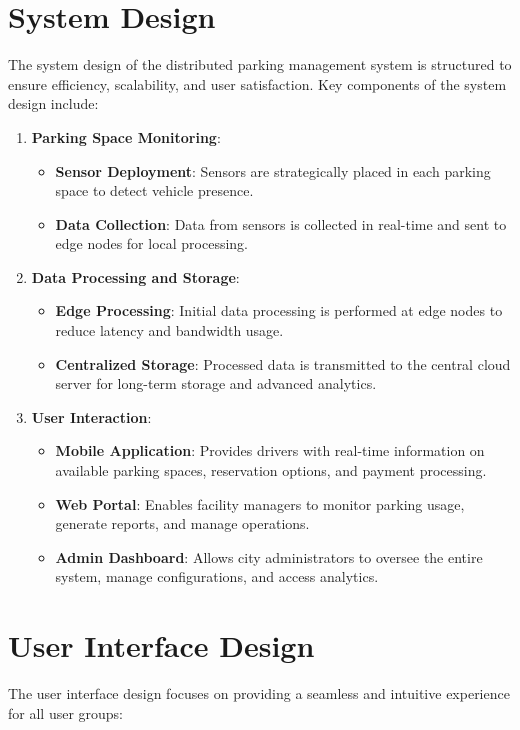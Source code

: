 \documentclass[oneside, 12pt, a4paper, draft]{book}
\begin{document}
\section{System Design}
\label{sec:orgf724c55}
The system design of the distributed parking management system is structured to ensure efficiency, scalability, and user satisfaction. Key components of the system design include:

\begin{enumerate}
\item \textbf{\textbf{Parking Space Monitoring}}:
\begin{itemize}
\item \textbf{\textbf{Sensor Deployment}}: Sensors are strategically placed in each parking space to detect vehicle presence.
\item \textbf{\textbf{Data Collection}}: Data from sensors is collected in real-time and sent to edge nodes for local processing.
\end{itemize}

\item \textbf{\textbf{Data Processing and Storage}}:
\begin{itemize}
\item \textbf{\textbf{Edge Processing}}: Initial data processing is performed at edge nodes to reduce latency and bandwidth usage.
\item \textbf{\textbf{Centralized Storage}}: Processed data is transmitted to the central cloud server for long-term storage and advanced analytics.
\end{itemize}

\item \textbf{\textbf{User Interaction}}:
\begin{itemize}
\item \textbf{\textbf{Mobile Application}}: Provides drivers with real-time information on available parking spaces, reservation options, and payment processing.
\item \textbf{\textbf{Web Portal}}: Enables facility managers to monitor parking usage, generate reports, and manage operations.
\item \textbf{\textbf{Admin Dashboard}}: Allows city administrators to oversee the entire system, manage configurations, and access analytics.
\end{itemize}
\end{enumerate}
\section{User Interface Design}
\label{sec:org49baf1a}
The user interface design focuses on providing a seamless and intuitive experience for all user groups:
\end{document}
